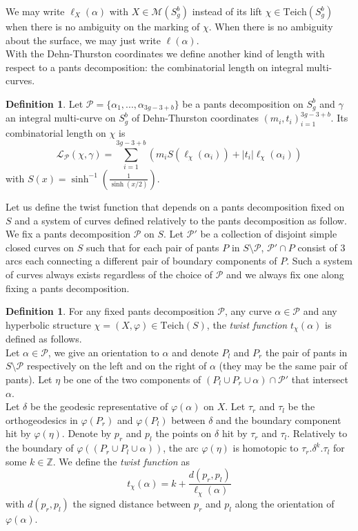 \documentclass[a4paper,12pt]{article}
\theoremstyle{definition}
\newtheorem{definition}[theorem]{Definition}
\theoremstyle{remark}
\begin{document}
We may write $\ell_X(\alpha) $ with $X \in \mathcal{M}(S_g^b)$ instead of its lift $\chi \in \mathrm{Teich}(S_g^b)$ when there is no ambiguity on the marking of $\chi$. When there is no ambiguity about the surface, we may just write $\ell(\alpha)$. \\

With the Dehn-Thurston coordinates we define another kind of length with respect to a pants decomposition: the combinatorial length on integral multi-curves.
\begin{definition}
    Let $\mathcal{P}=\{\alpha_1,...,\alpha_{3g-3+b}\}$ be a pants decomposition on $S_g^{b}$ and $\gamma$ an integral multi-curve on $S_g^{b}$ of Dehn-Thurston coordinates $(m_i,t_i)^{3g-3+b}_{i=1}$. Its combinatorial length on $\chi$ is
    \[
        \mathcal{L}_\mathcal{P}(\chi,\gamma) = \sum_{i=1}^{3g-3+b} \left( m_i S(\ell_\chi(\alpha_i)) + |t_i|\ell_\chi(\alpha_i)  \right)
    \]
    with $S(x)=\sinh^{-1}\left( \frac{1}{\sinh(x/2)} \right)$.
\end{definition}

Let us define the twist function that depends on a pants decomposition fixed on $S$ and a system of curves defined relatively to the pants decomposition as follow. 
We fix a pants decomposition $\mathcal{P}$ on $S$. Let $\mathcal{P}'$ be a collection of disjoint simple closed curves on $S$ such that for each pair of pants $P$ in $S \setminus \mathcal{P}$, $\mathcal{P}' \cap P$ consist of $3$ arcs each connecting a different pair of boundary components of $P$. Such a system of curves always exists regardless of the choice of $\mathcal{P}$ and we always fix one along fixing a pants decomposition. 


\begin{definition}
    For any fixed pants decomposition $\mathcal{P}$, any curve $\alpha \in \mathcal{P}$ and any hyperbolic structure $\chi = (X,\varphi) \in \mathrm{Teich}(S)$, the \emph{twist function} $t_{\chi}(\alpha)$ is defined as follows. \\
    
    Let $\alpha \in \mathcal{P}$, we give an orientation to $\alpha$ and denote $P_l$ and $P_r$ the pair of pants in $S \setminus \mathcal{P}$ respectively on the left and on the right of $\alpha$ (they may be the same pair of pants). Let $\eta$ be one of the two components of $(P_l \cup P_r \cup \alpha) \cap \mathcal{P}'$ that intersect $\alpha$.\\
    
    Let $\delta$ be the geodesic representative of $\varphi(\alpha)$ on $X$. Let $\tau_r$ and $\tau_l$ be the orthogeodesics in $\varphi(P_r)$ and $\varphi(P_l)$ between $\delta$ and the boundary component hit by $\varphi(\eta)$. Denote by $p_r$ and $p_l$ the points on $\delta$ hit by $\tau_r$ and $\tau_l$. Relatively to the boundary of $\varphi ( (P_r \cup P_l \cup \alpha) )$, the arc $\varphi(\eta)$ is homotopic to $\tau_r . \delta^k . \tau_l$ for some $k \in \mathbb{Z}$. We define the \emph{twist function} as 
    \[
        t_{\chi}(\alpha)=k + \frac{d(p_r,p_l)}{\ell_\chi(\alpha)}
    \]
    with $d(p_r,p_l)$ the signed distance between $p_r$ and $p_l$ along the orientation of $\varphi(\alpha)$.    
\end{definition}
\end{document}
